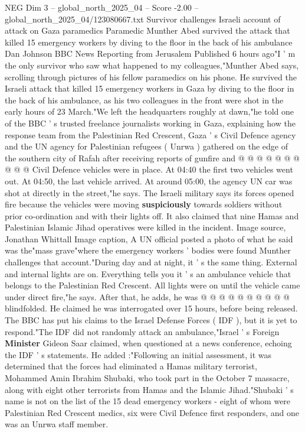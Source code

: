 \begin{textsample}{NEG Dim 3 – global\_north\_2025\_04 – Score -2.00 – global\_north\_2025\_04/123080667.txt}  \label{ex:f3_neg_399}
Survivor challenges Israeli account of attack on Gaza paramedics Paramedic Munther Abed survived the attack that killed 15 emergency workers by diving to the floor in the back of his ambulance Dan Johnson BBC News Reporting from Jerusalem Published 6 hours ago"I ' m the only survivor who saw what happened to my colleagues,"Munther Abed says, scrolling through pictures of his fellow paramedics on his phone.
He survived the Israeli attack that killed 15 emergency workers in Gaza by diving to the floor in the back of his ambulance, as his two colleagues in the front were shot in the early hours of 23 March."We left the headquarters roughly at dawn,"he told one of the BBC ' s trusted freelance journalists working in Gaza, explaining how the response team from the Palestinian Red Crescent, Gaza ' s Civil Defence agency and the UN agency for Palestinian refugees ( Unrwa ) gathered on the edge of the southern city of Rafah after receiving reports of gunfire and @ @ @ @ @ @ @ @ @ @ Civil Defence vehicles were in place.
At 04:40 the first two vehicles went out.
At 04:50, the last vehicle arrived.
At around 05:00, the agency UN car was shot at directly in the street,"he says.
The Israeli military says its forces opened fire because the vehicles were moving \textbf{suspiciously} towards soldiers without prior co-ordination and with their lights off.
It also claimed that nine Hamas and Palestinian Islamic Jihad operatives were killed in the incident.
Image source, Jonathan Whittall Image caption, A UN official posted a photo of what he said was the"mass grave"where the emergency workers ' bodies were found Munther challenges that account."During day and at night, it ' s the same thing.
External and internal lights are on.
Everything tells you it ' s an ambulance vehicle that belongs to the Palestinian Red Crescent.
All lights were on until the vehicle came under direct fire,"he says.
After that, he adds, he was @ @ @ @ @ @ @ @ @ @ blindfolded.
He claimed he was interrogated over 15 hours, before being released.
The BBC has put his claims to the Israel Defense Forces ( IDF ), but it is yet to respond."The IDF did not randomly attack an ambulance,"Israel ' s Foreign \textbf{Minister} Gideon Saar claimed, when questioned at a news conference, echoing the IDF ' s statements.
He added :"Following an initial assessment, it was determined that the forces had eliminated a Hamas military terrorist, Mohammed Amin Ibrahim Shubaki, who took part in the October 7 massacre, along with eight other terrorists from Hamas and the Islamic Jihad."Shubaki ' s name is not on the list of the 15 dead emergency workers - eight of whom were Palestinian Red Crescent medics, six were Civil Defence first responders, and one was an Unrwa staff member.

\end{textsample}
